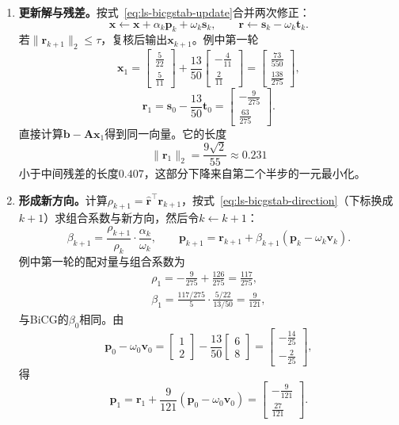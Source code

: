 \begin{enumerate}
 \item \textbf{更新解与残差。}按式~\eqref{eq:ls-bicgstab-update}合并两次修正：
 \[
  \bm x\leftarrow\bm x+\alpha_k\bm p_k+\omega_k\bm s_k,\qquad \bm r\leftarrow\bm s_k-\omega_k\bm t_k .
 \]
 若$\lVert\bm r_{k+1}\rVert_2\le\tau$，复核后输出$\bm x_{k+1}$。例中第一轮
 \[
  \bm x_1=\begin{bmatrix}\tfrac5{22}\\\tfrac5{11}\end{bmatrix}+\frac{13}{50}\begin{bmatrix}-\tfrac4{11}\\\tfrac2{11}\end{bmatrix}=\begin{bmatrix}\tfrac{73}{550}\\\tfrac{138}{275}\end{bmatrix},
 \]
 \[
  \bm r_1=\bm s_0-\frac{13}{50}\bm t_0=\begin{bmatrix}-\tfrac9{275}\\\tfrac{63}{275}\end{bmatrix}.
 \]
 直接计算$\bm b-\bm A\bm x_1$得到同一向量。它的长度
 \[
  \lVert\bm r_1\rVert_2=\frac{9\sqrt2}{55}\approx0.231
 \]
 小于中间残差的长度$0.407$，这部分下降来自第二个半步的一元最小化。

 \item \textbf{形成新方向。}计算$\rho_{k+1}=\widehat{\bm r}^\top\bm r_{k+1}$，按式~\eqref{eq:ls-bicgstab-direction}（下标换成$k+1$）求组合系数与新方向，然后令$k\leftarrow k+1$：
 \[
  \beta_{k+1}=\frac{\rho_{k+1}}{\rho_k}\cdot\frac{\alpha_k}{\omega_k},\qquad
  \bm p_{k+1}=\bm r_{k+1}+\beta_{k+1}(\bm p_k-\omega_k\bm v_k).
 \]
 例中第一轮的配对量与组合系数为
 \[
  \begin{gathered}
  \rho_1=-\frac9{275}+\frac{126}{275}=\frac{117}{275},\\
  \beta_1=\frac{117/275}{5}\cdot\frac{5/22}{13/50}=\frac9{121},
  \end{gathered}
 \]
 与BiCG的$\beta_0$相同。由
 \[
  \bm p_0-\omega_0\bm v_0=\begin{bmatrix}1\\2\end{bmatrix}-\frac{13}{50}\begin{bmatrix}6\\8\end{bmatrix}=\begin{bmatrix}-\tfrac{14}{25}\\-\tfrac2{25}\end{bmatrix},
 \]
 得
 \[
  \bm p_1=\bm r_1+\frac9{121}(\bm p_0-\omega_0\bm v_0)=\begin{bmatrix}-\tfrac9{121}\\\tfrac{27}{121}\end{bmatrix}.
 \]


\end{enumerate}
